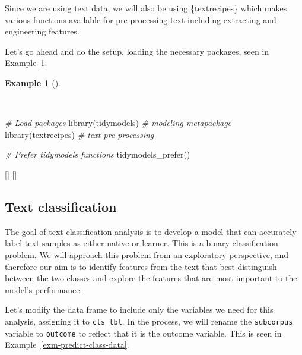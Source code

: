 \documentclass[
  letterpaper,
  krantz1]{latex/krantz-mod}
\newenvironment{Shaded}{\begin{snugshade}}{\end{snugshade}}
\newcommand{\CommentTok}[1]{\textcolor[rgb]{0.00,0.00,0.00}{\textit{#1}}}
\newcommand{\FunctionTok}[1]{\textcolor[rgb]{0.00,0.00,0.00}{#1}}
\newcommand{\NormalTok}[1]{\textcolor[rgb]{0.00,0.00,0.00}{#1}}
\newcommand{\cindex}[1]{%
  \StrSubstitute{#1}{_}{\_}[\temp]%
  \index{\temp}%
}
\theoremstyle{definition}
\theoremstyle{definition}
\newtheorem{example}{Example}[chapter]
\theoremstyle{remark}
\begin{document}
Since we are using text data, we will also be using \{textrecipes\}
which makes various functions available for pre-processing text
including extracting and engineering features.

Let's go ahead and do the setup, loading the necessary packages, seen in
Example~\ref{exm-predict-packages-data}.

\begin{example}[]\protect\hypertarget{exm-predict-packages-data}{}\label{exm-predict-packages-data}

~

\begin{Shaded}
\begin{Highlighting}[numbers=left,,]
\CommentTok{\# Load packages}
\FunctionTok{library}\NormalTok{(tidymodels)   }\CommentTok{\# modeling metapackage}
\FunctionTok{library}\NormalTok{(textrecipes)  }\CommentTok{\# text pre{-}processing}

\CommentTok{\# Prefer tidymodels functions}
\FunctionTok{tidymodels\_prefer}\NormalTok{()}
\end{Highlighting}
\end{Shaded}

\cindex{tidymodels_prefer()}\cindex{library()}

\end{example}

\subsection{Text classification}\label{sec-predict-text-classification}

The goal of text classification analysis is to develop a model that can
accurately label text samples as either native or learner. This is a
binary classification problem. We will approach this problem from an
exploratory perspective, and therefore our aim is to identify features
from the text that best distinguish between the two classes and explore
the features that are most important to the model's
performance.

Let's modify the data frame to include only the variables we need for
this analysis, assigning it to \texttt{cls\_tbl}. In the process, we
will rename the \texttt{subcorpus} variable to \texttt{outcome} to
reflect that it is the outcome variable. This is seen in
Example~\ref{exm-predict-class-data}.
\end{document}
